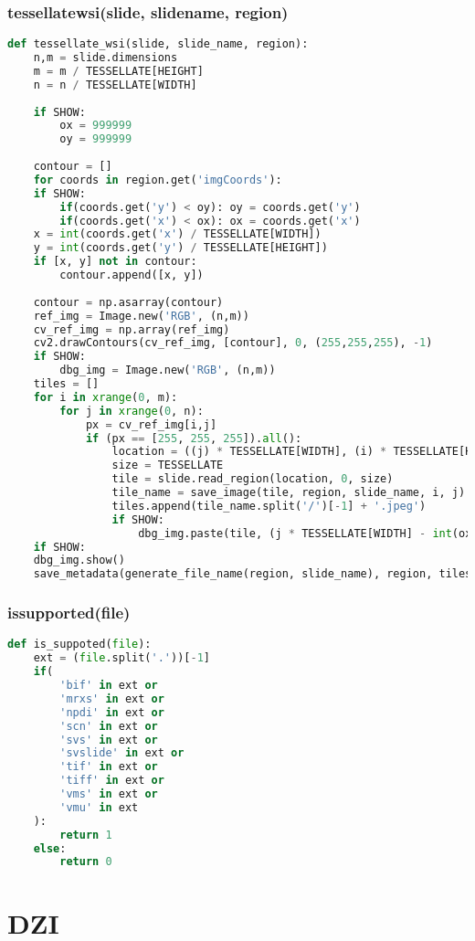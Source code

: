 \subsubsection{tessellate{\textunderscore}wsi(slide, slide{\textunderscore}name, region)}

\begin{lstlisting}[frame=single,language=python]
def tessellate_wsi(slide, slide_name, region):
	n,m = slide.dimensions
	m = m / TESSELLATE[HEIGHT]
	n = n / TESSELLATE[WIDTH]
	
	if SHOW:
		ox = 999999
		oy = 999999
	
	contour = []
	for coords in region.get('imgCoords'):
	if SHOW:
		if(coords.get('y') < oy): oy = coords.get('y')
		if(coords.get('x') < ox): ox = coords.get('x')
	x = int(coords.get('x') / TESSELLATE[WIDTH])
	y = int(coords.get('y') / TESSELLATE[HEIGHT])
	if [x, y] not in contour:
		contour.append([x, y])
	
	contour = np.asarray(contour)
	ref_img = Image.new('RGB', (n,m))
	cv_ref_img = np.array(ref_img)
	cv2.drawContours(cv_ref_img, [contour], 0, (255,255,255), -1)
	if SHOW:
		dbg_img = Image.new('RGB', (n,m))
	tiles = []
	for i in xrange(0, m):
		for j in xrange(0, n):
			px = cv_ref_img[i,j]
			if (px == [255, 255, 255]).all():
				location = ((j) * TESSELLATE[WIDTH], (i) * TESSELLATE[HEIGHT])
				size = TESSELLATE
				tile = slide.read_region(location, 0, size)
				tile_name = save_image(tile, region, slide_name, i, j)
				tiles.append(tile_name.split('/')[-1] + '.jpeg')
				if SHOW:
					dbg_img.paste(tile, (j * TESSELLATE[WIDTH] - int(ox), i * TESSELLATE[HEIGHT] - int(oy)))
	if SHOW:
	dbg_img.show()
	save_metadata(generate_file_name(region, slide_name), region, tiles)
\end{lstlisting}


\subsubsection{is{\textunderscore}supported(file)}

\begin{lstlisting}[frame=single,language=python]
def is_suppoted(file):
	ext = (file.split('.'))[-1]
	if(
		'bif' in ext or
		'mrxs' in ext or
		'npdi' in ext or
		'scn' in ext or
		'svs' in ext or
		'svslide' in ext or
		'tif' in ext or
		'tiff' in ext or
		'vms' in ext or
		'vmu' in ext
	):
		return 1
	else:
		return 0
\end{lstlisting}


\section{DZI}

